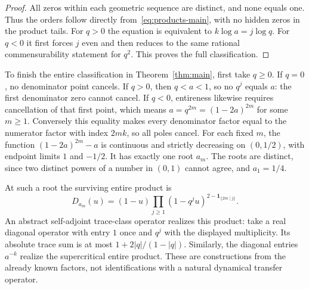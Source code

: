 \begin{proof}
All zeros within each geometric sequence are distinct, and none equals one.
Thus the orders follow directly from~\eqref{eq:products-main}, with no hidden
zeros in the product tails. For $q>0$ the equation is equivalent to
$k\log a=j\log q$. For $q<0$ it first forces $j$ even and then reduces to
the same rational commensurability statement for $q^2$. This proves the full
classification.
\end{proof}

To finish the entire classification in Theorem~\ref{thm:main}, first take
$q\ge0$. If $q=0$, no denominator point cancels. If $q>0$, then $q<a<1$, so
no $q^j$ equals $a$: the first denominator zero cannot cancel. If $q<0$,
entireness likewise requires cancellation of that first point, which means
$a=q^{2m}=(1-2a)^{2m}$ for some $m\ge1$. Conversely this equality makes
every denominator factor equal to the numerator factor with index $2mk$, so
all poles cancel. For each fixed $m$, the function $(1-2a)^{2m}-a$ is
continuous and strictly decreasing on $(0,1/2)$, with endpoint limits $1$ and
$-1/2$. It has exactly one root $a_m$. The roots are distinct, since two
distinct powers of a number in $(0,1)$ cannot agree, and $a_1=1/4$.

At such a root the surviving entire product is
\begin{equation}\label{eq:resonant}
 D_{a_m}(u)=(1-u)\prod_{j\ge1}
 (1-q^ju)^{2-\boldsymbol{1}_{\{2m\mid j\}}}.
\end{equation}
An abstract self-adjoint trace-class operator realizes this product: take a
real diagonal operator with entry $1$ once and $q^j$ with the displayed
multiplicity. Its absolute trace sum is at most $1+2|q|/(1-|q|)$. Similarly,
the diagonal entries $a^{-k}$ realize the supercritical entire product. These
are constructions from the already known factors, not identifications with
a natural dynamical transfer operator.
